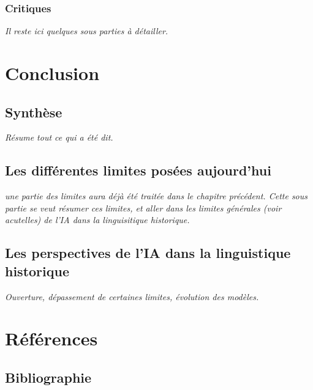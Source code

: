\documentclass[12pt, a4, french]{report}
\begin{document}
\subsection{Critiques}
\textit{Il reste ici quelques sous parties à détailler.}

\chapter{Conclusion}
\section{Synthèse}
\textit{Résume tout ce qui a été dit.}
\section{Les différentes limites posées aujourd'hui}
\textit{une partie des limites aura déjà été traitée dans le chapitre précédent. Cette sous partie se veut résumer ces limites, et aller dans les limites générales (voir acutelles) de l'IA dans  la linguisitique historique.}
\section{Les perspectives de l'IA dans la linguistique historique}
\textit{Ouverture, dépassement de certaines limites, évolution des modèles.}

\chapter{Références}
\section{Bibliographie}

\printbibliography
\end{document}
